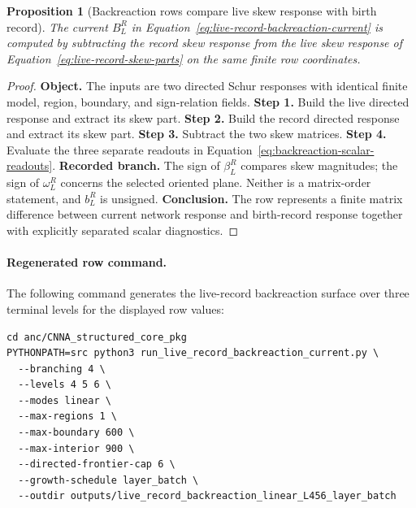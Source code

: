 \documentclass[11pt]{article}
\newtheorem{proposition}[definition]{Proposition}
\theoremstyle{remark}
\numberwithin{equation}{section}
\begin{document}
\begin{proposition}[Backreaction rows compare live skew response with birth record]
The current $B^{R}_L$ in Equation~\eqref{eq:live-record-backreaction-current} is computed by subtracting the record skew response from the live skew response of Equation~\eqref{eq:live-record-skew-parts} on the same finite row coordinates.
\end{proposition}
\begin{proof}
\textbf{Object.} The inputs are two directed Schur responses with identical finite model, region, boundary, and sign-relation fields. \textbf{Step 1.} Build the live directed response and extract its skew part. \textbf{Step 2.} Build the record directed response and extract its skew part. \textbf{Step 3.} Subtract the two skew matrices. \textbf{Step 4.} Evaluate the three separate readouts in Equation~\eqref{eq:backreaction-scalar-readouts}. \textbf{Recorded branch.} The sign of \(\beta_L^R\) compares skew magnitudes; the sign of \(\omega_L^R\) concerns the selected oriented plane. Neither is a matrix-order statement, and \(b_L^R\) is unsigned. \textbf{Conclusion.} The row represents a finite matrix difference between current network response and birth-record response together with explicitly separated scalar diagnostics.
\end{proof}

\paragraph{Regenerated row command.}
The following command generates the live-record backreaction surface over three terminal levels for the displayed row values:
\begin{verbatim}
cd anc/CNNA_structured_core_pkg
PYTHONPATH=src python3 run_live_record_backreaction_current.py \
  --branching 4 \
  --levels 4 5 6 \
  --modes linear \
  --max-regions 1 \
  --max-boundary 600 \
  --max-interior 900 \
  --directed-frontier-cap 6 \
  --growth-schedule layer_batch \
  --outdir outputs/live_record_backreaction_linear_L456_layer_batch
\end{verbatim}
\end{document}
